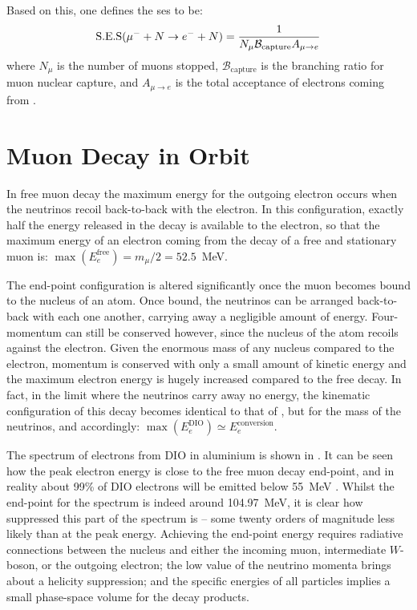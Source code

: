 Based on this, one defines the \acf{ses} to be:
\begin{equation}
	\eqlabel{det:ses}
\mathrm{S.E.S}(\muec)=\frac{1}{N_\mu \mathcal{B}_\mathrm{capture} A_{\mu\rightarrow e}}
\end{equation}
where $N_\mu$ is the number of muons stopped, $\mathcal{B}_\mathrm{capture}$ is the branching ratio for muon nuclear capture, and $A_{\mu\rightarrow e}$ is the total acceptance of electrons coming from \mueconv.

\section{Muon Decay in Orbit}
\FigDecayInOrbitSpectrum
In free muon decay the maximum energy for the outgoing electron occurs when the neutrinos recoil back-to-back with the electron.
In this configuration, exactly half the energy released in the decay is available to the electron, so that the maximum energy of an electron coming from the decay of a free and stationary muon is: $\max(E_{e}^\textrm{free})=m_\mu/2=52.5$~MeV.

The end-point configuration is altered significantly once the muon becomes bound to the nucleus of an atom.
Once bound, the neutrinos can be arranged back-to-back with each one another, carrying away a negligible amount of energy.
Four-momentum can still be conserved however, since the nucleus of the atom recoils against the electron.  
Given the enormous mass of any nucleus compared to the electron, momentum is conserved with only a small amount of kinetic energy and the maximum electron energy is hugely increased compared to the free decay.
In fact, in the limit where the neutrinos carry away no energy, the kinematic configuration of this decay becomes identical to that of \mueconv, but for the mass of the neutrinos, and accordingly: $\max(E_{e}^\textrm{DIO})\simeq{}E_{e}^\textrm{conversion}$.

The spectrum of electrons from \ac{DIO} in aluminium is shown in .
It can be seen how the peak electron energy is close to the free muon decay end-point, and in reality about 99\% of \ac{DIO} electrons will be emitted below 55~MeV .
Whilst the end-point for the spectrum is indeed around 104.97~MeV, it is clear how suppressed this part of the spectrum is -- some twenty orders of magnitude less likely than at the peak energy.
Achieving the end-point energy requires radiative connections between the nucleus and either the incoming muon, intermediate $W$-boson, or the outgoing electron; the low value of the neutrino momenta brings about a helicity suppression; and the specific energies of all particles implies a small phase-space volume for the decay products.

